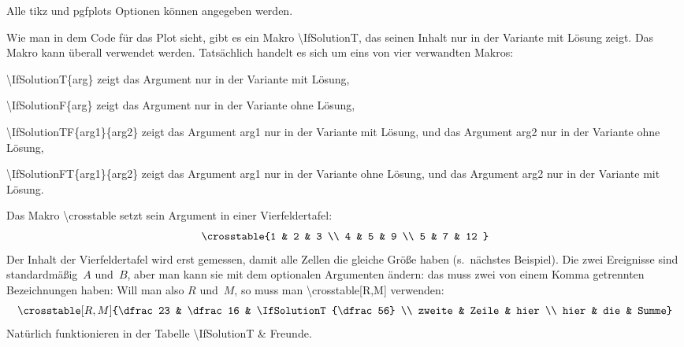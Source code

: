 \documentclass[hyperworksheet]{drcschool}
\newcommand*{\cs}[1]{\textup{\ttfamily\textbackslash#1}}                   %
\newcommand*{\pkg}[1]{\textup{\ttfamily#1}}                                %
\newcommand*{\opt}[1]{\textup{\ttfamily#1}}                                %
\begin{document}
\begin{worksheet*}[title={Verschiedenes},solution=true]
\noindent
Alle \pkg{tikz} und \pkg{pgfplots} Optionen können angegeben werden.

Wie man in dem Code für das Plot sieht, gibt es ein Makro \cs{IfSolutionT}, das
seinen Inhalt nur in der Variante mit Lösung zeigt. Das Makro kann überall verwendet
werden.  Tatsächlich handelt
es sich um eins von vier verwandten Makros:
\begin{compactitem}
\item \cs{IfSolutionT\{arg\}} zeigt das Argument nur in der Variante mit Lösung,
\item \cs{IfSolutionF\{arg\}} zeigt das Argument nur in der Variante ohne Lösung,
\item \cs{IfSolutionTF\{arg1\}\{arg2\}} zeigt das Argument \opt{arg1} nur in der Variante mit Lösung,
und das Argument \opt{arg2} nur in der Variante ohne Lösung,
\item \cs{IfSolutionFT\{arg1\}\{arg2\}} zeigt das Argument \opt{arg1} nur in der Variante ohne Lösung,
und das Argument \opt{arg2} nur in der Variante mit Lösung.
\end{compactitem}

\exercise[Vierfeldertafeln]
Das Makro \cs{crosstable} setzt sein Argument in einer Vierfeldertafel:
\[
\crosstable{%
   1 & 2 & 3 \\
   4 & 5 & 9 \\
   5 & 7 & 12
}
\]
Der Inhalt der Vierfeldertafel wird erst gemessen, damit alle Zellen die gleiche
Größe haben (s.~nächstes Beispiel). Die zwei Ereignisse sind standardmäßig~$A$
und~$B$, aber man kann sie mit dem optionalen Argumenten ändern: das muss zwei
von einem Komma getrennten Bezeichnungen haben: Will man
also $R$ und~$M$, so muss man \cs{crosstable[R,M]} verwenden:
\[
\crosstable[R,M]{\dfrac23 & \dfrac16 & \IfSolutionT{\dfrac56} \\ zweite & Zeile & hier \\ hier & die & Summe}
\]
Natürlich funktionieren in der Tabelle \cs{IfSolutionT} \& Freunde.


\end{worksheet*}
\end{document}
